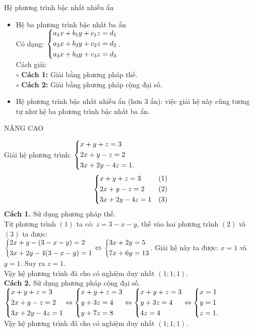 
\begin{dang}{Hệ phương trình bậc nhất nhiều ẩn}
    \begin{itemize}
     \item Hệ ba phương trình bậc nhất ba ẩn\\
     Có dạng: $\left\{\begin{aligned}& a_1x + b_1y + c_1z = d_1 \\& a_2x + b_2y + c_2z = d_2 \\& a_3x + b_3y + c_3z = d_3\end{aligned}\right.$.\\
     Cách giải:\\
     $\circ$ \textbf{Cách 1:} Giải bằng phương pháp thế.\\
     $\circ$ \textbf{Cách 2:} Giải bằng phương pháp cộng đại số.
     \item Hệ phương trình bậc nhất nhiều ẩn (hơn $3$ ẩn): việc giải hệ này cũng tương tự như hệ ba phương trình bậc nhất ba ẩn.
    \end{itemize}
\end{dang}

\begin{center}
	NÂNG CAO
\end{center}

\begin{ex}%
 Giải hệ phương trình: $\left\{\begin{aligned}& x+y+z=3 \\& 2x+y-z=2 \\& 3x+2y-4z=1.\end{aligned}\right.$
 \loigiai
  {
  $$\left\{\begin{aligned}& x+y+z=3 & (1) \\& 2x+y-z=2 & (2) \\& 3x+2y-4z=1 & (3)\end{aligned}\right.$$
  \textbf{Cách 1.} Sử dụng phương pháp thế.\\
  Từ phương trình $(1)$ ta có: $z = 3 - x - y$, thế vào hai phương trình $(2)$ và $(3)$ ta được:\\
  $\left\{\begin{aligned}& 2x+y-(3-x-y)=2 \\& 3x+2y-4(3-x-y)=1\end{aligned}\right. \Leftrightarrow \left\{\begin{aligned}& 3x+2y=5 \\& 7x+6y=13\end{aligned}\right.$. 
  Giải hệ này ta được: $x = 1$ và $y = 1$. Suy ra $z = 1$.\\
  Vậy hệ phương trình đã cho có nghiệm duy nhất $(1;1;1)$.\\
  \textbf{Cách 2.} Sử dụng phương pháp cộng đại số.\\
  \hspace*{0.5cm}$\left\{\begin{aligned}& x+y+z=3 \\& 2x+y-z=2 \\& 3x+2y-4z=1\end{aligned}\right. \Leftrightarrow \left\{\begin{aligned}& x+y+z=3 \\& y+3z=4 \\& y+7z=8\end{aligned}\right. \Leftrightarrow \left\{\begin{aligned}& x+y+z=3 \\& y+3z=4 \\& 4z=4\end{aligned}\right. \Leftrightarrow \left\{\begin{aligned}& x=1 \\& y=1 \\& z=1.\end{aligned}\right.$\\
  Vậy hệ phương trình đã cho có nghiệm duy nhất $(1;1;1)$.\\
  }
\end{ex}


